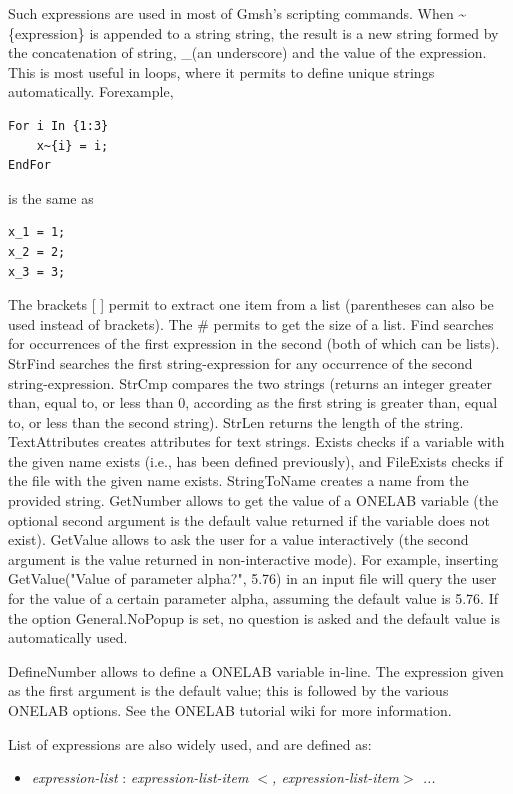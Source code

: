 \documentclass[dvipdfmx, 9pt, a4paper]{article}
\numberwithin{equation}{section}
\begin{document}
Such expressions are used in most of Gmsh's scripting commands. When \textasciitilde\{expression\} is appended to a string string, the result is a new string formed by the concatenation of string, \_(an underscore) and the value of the expression. This is most useful in loops, where it permits to define unique strings automatically. Forexample,
\begin{lstlisting}
For i In {1:3}
    x~{i} = i;
EndFor
\end{lstlisting}
is the same as
\begin{lstlisting}
x_1 = 1;
x_2 = 2;
x_3 = 3;
\end{lstlisting}
The brackets [ ] permit to extract one item from a list (parentheses can also be used instead of brackets). The \# permits to get the size of a list. Find searches for occurrences of the first expression in the second (both of which can be lists). StrFind searches the first string-expression for any occurrence of the second string-expression. StrCmp compares the two strings (returns an integer greater than, equal to, or less than 0, according as the first string is greater than, equal to, or less than the second string). StrLen returns the length of the string. TextAttributes creates attributes for text strings. Exists checks if a variable with the given name exists (i.e., has been defined previously), and FileExists checks if the file with the given name exists. StringToName creates a name from the provided string. GetNumber allows to get the value of a ONELAB variable (the optional second argument is the default value returned if the variable does not exist). GetValue allows to ask the user for a value interactively (the second argument is the value returned in non-interactive mode). For example, inserting GetValue("Value of parameter alpha?", 5.76) in an input file will query the user for the value of a certain parameter alpha, assuming the default value is 5.76. If the option General.NoPopup is set, no question is asked and the default value is automatically used.\par
DefineNumber allows to define a ONELAB variable in-line. The expression given as the first argument is the default value; this is followed by the various ONELAB options. See the ONELAB tutorial wiki for more information.\par
List of expressions are also widely used, and are defined as:
\begin{itemize}
\item {\it expression-list} : {\it expression-list-item $<$, expression-list-item$>$ ...}
\end{itemize}
\end{document}
